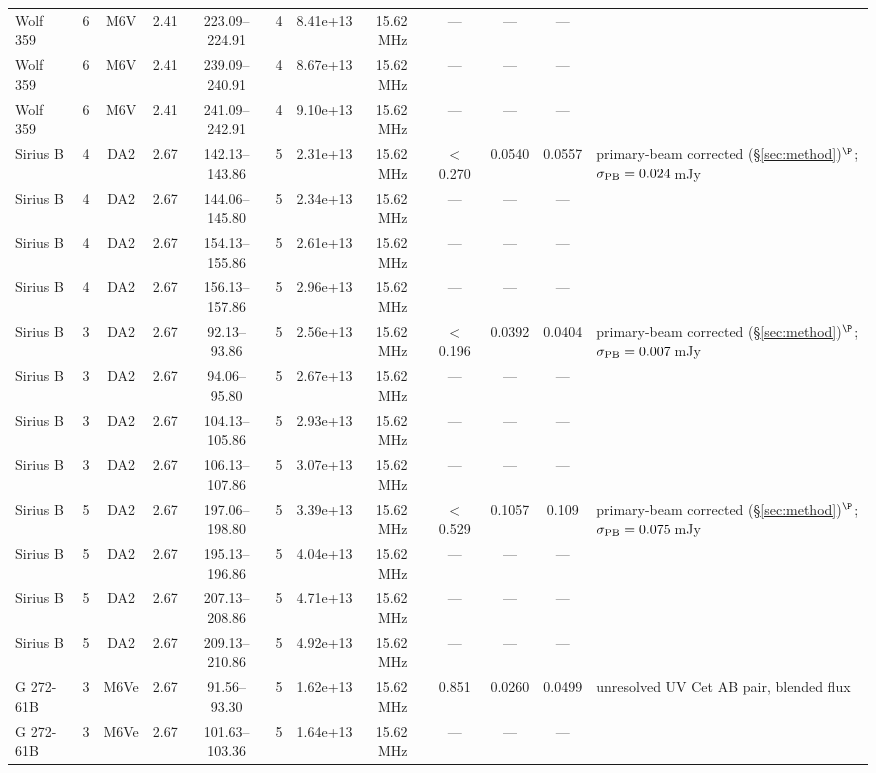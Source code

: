 \documentclass{openjournal}
\begin{document}
\begin{table}
\begin{tabularx}{\textwidth}{@{}l c c c c c c c c c c X@{}}
 Wolf  359 & 6 & M6V & 2.41 & 223.09--224.91 & 4 & 8.41e+13 & 15.62\,MHz & --- & --- & --- &  \\
 Wolf  359 & 6 & M6V & 2.41 & 239.09--240.91 & 4 & 8.67e+13 & 15.62\,MHz & --- & --- & --- &  \\
 Wolf  359 & 6 & M6V & 2.41 & 241.09--242.91 & 4 & 9.10e+13 & 15.62\,MHz & --- & --- & --- &  \\
 Sirius B & 4 & DA2 & 2.67 & 142.13--143.86 & 5 & 2.31e+13 & 15.62\,MHz & $<$0.270 & 0.0540 & 0.0557 & primary-beam corrected (\S\ref{sec:method})$^{\P}$; $\sigma_{\rm PB}=0.024$\,mJy \\
 Sirius B & 4 & DA2 & 2.67 & 144.06--145.80 & 5 & 2.34e+13 & 15.62\,MHz & --- & --- & --- &  \\
 Sirius B & 4 & DA2 & 2.67 & 154.13--155.86 & 5 & 2.61e+13 & 15.62\,MHz & --- & --- & --- &  \\
 Sirius B & 4 & DA2 & 2.67 & 156.13--157.86 & 5 & 2.96e+13 & 15.62\,MHz & --- & --- & --- &  \\
 Sirius B & 3 & DA2 & 2.67 & 92.13--93.86 & 5 & 2.56e+13 & 15.62\,MHz & $<$0.196 & 0.0392 & 0.0404 & primary-beam corrected (\S\ref{sec:method})$^{\P}$; $\sigma_{\rm PB}=0.007$\,mJy \\
 Sirius B & 3 & DA2 & 2.67 & 94.06--95.80 & 5 & 2.67e+13 & 15.62\,MHz & --- & --- & --- &  \\
 Sirius B & 3 & DA2 & 2.67 & 104.13--105.86 & 5 & 2.93e+13 & 15.62\,MHz & --- & --- & --- &  \\
 Sirius B & 3 & DA2 & 2.67 & 106.13--107.86 & 5 & 3.07e+13 & 15.62\,MHz & --- & --- & --- &  \\
 Sirius B & 5 & DA2 & 2.67 & 197.06--198.80 & 5 & 3.39e+13 & 15.62\,MHz & $<$0.529 & 0.1057 & 0.109 & primary-beam corrected (\S\ref{sec:method})$^{\P}$; $\sigma_{\rm PB}=0.075$\,mJy \\
 Sirius B & 5 & DA2 & 2.67 & 195.13--196.86 & 5 & 4.04e+13 & 15.62\,MHz & --- & --- & --- &  \\
 Sirius B & 5 & DA2 & 2.67 & 207.13--208.86 & 5 & 4.71e+13 & 15.62\,MHz & --- & --- & --- &  \\
 Sirius B & 5 & DA2 & 2.67 & 209.13--210.86 & 5 & 4.92e+13 & 15.62\,MHz & --- & --- & --- &  \\
 G 272-61B & 3 & M6Ve & 2.67 & 91.56--93.30 & 5 & 1.62e+13 & 15.62\,MHz & 0.851 & 0.0260 & 0.0499 & unresolved UV Cet AB pair, blended flux \\
 G 272-61B & 3 & M6Ve & 2.67 & 101.63--103.36 & 5 & 1.64e+13 & 15.62\,MHz & --- & --- & --- &  \\

\end{tabularx}
\end{table}
\end{document}
